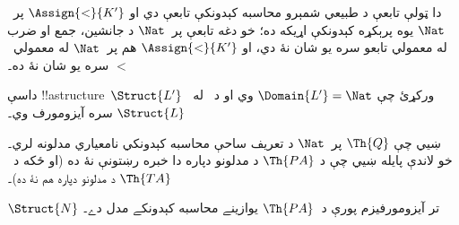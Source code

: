 \documentclass[../../../include/open-logic-section]{subfiles}
\begin{document}
\begin{ex}
دا ټولې تابعې د طبيعي شمېرو محاسبه کېدونکې تابعې دي او
$\Assign{<}{K'}$ پر~$\Nat$ يوه پرېکړه کېدونکې اړيکه ده؛ خو دغه
تابعې پر~$\Nat$ د جانشين، جمع او ضرب له معمولي تابعو سره يو شان نۀ
دي، او $\Assign{<}{K'}$ هم پر~$\Nat$ له معمولي~$<$ سره يو شان نۀ ده۔
\end{ex}

\begin{prob}
داسې !!a{structure}~$\Struct{L'}$ ورکړئ چې $\Domain{L'}=\Nat$ وي او
د~ له~$\Struct{L}$ سره
آيزومورف وي۔
\end{prob}

\begin{explain}
 ښيي چې $\Th{Q}$ پر~$\Nat$ د تعريف ساحې
محاسبه کېدونکي نامعياري مدلونه لري۔ خو لاندې پايله ښيي چې د
$\Th{PA}$ د مدلونو دپاره دا خبره رښتونې نۀ ده (او ځکه د~$\Th{TA}$
د مدلونو دپاره هم نۀ ده)۔
\end{explain}

\begin{thm}
$\Struct{N}$ تر آيزومورفيزم پورې د~$\Th{PA}$ يوازينے محاسبه
کېدونکے مدل دے۔
\end{thm}
\end{document}
